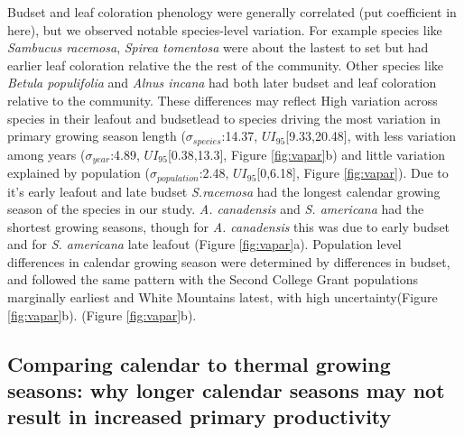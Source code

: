 \documentclass{article}[12pt]
\begin{document}
Budset and leaf coloration phenology were generally correlated (put coefficient in here), but we observed notable species-level variation. For example species like \emph{Sambucus racemosa}, \emph{Spirea tomentosa} were about the lastest to set but had earlier leaf coloration relative the the rest of the community. Other species like \emph{Betula populifolia} and \emph{Alnus incana} had both later budset and leaf coloration relative to the community. These differences may reflect %
High variation across species in their leafout and budsetlead to species driving the most variation in  primary growing season length  ($\sigma_{species}$:14.37, $UI_{95}$[9.33,20.48], with less variation among years ($\sigma_{year}$:4.89, $UI_{95}$[0.38,13.3], Figure \ref{fig:vapar}b) and little variation explained by population ($\sigma_{population}$:2.48, $UI_{95}$[0,6.18], Figure \ref{fig:vapar}). Due to it's early leafout and late budset \emph{S.racemosa} had the longest calendar growing season of the species in our study. %
\emph{A. canadensis} and \emph{S. americana} had the shortest growing seasons, though for \emph{A. canadensis} this was due to early budset and for \emph{S. americana} late leafout (Figure \ref{fig:vapar}a). %
Population level differences in calendar growing season were determined by differences in budset, and followed the same pattern with the Second College Grant populations marginally earliest and White Mountains latest, with high uncertainty(Figure \ref{fig:vapar}b). (Figure \ref{fig:vapar}b). %

\subsection{Comparing calendar to thermal growing seasons: why longer calendar seasons may not result in increased primary productivity}
\end{document}
